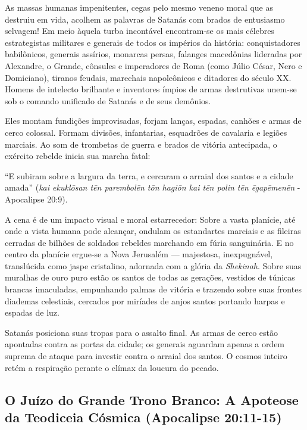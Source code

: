 \documentclass[11pt,a4paper,openany]{book}
\begin{document}
As massas humanas impenitentes, cegas pelo mesmo veneno moral que as destruiu em vida, acolhem as palavras de Satanás com brados de entusiasmo selvagem!
Em meio àquela turba incontável encontram-se os mais célebres estrategistas militares e generais de todos os impérios da história: conquistadores babilônicos, generais assírios, monarcas persas, falanges macedônias lideradas por Alexandre, o Grande, cônsules e imperadores de Roma (como Júlio César, Nero e Domiciano), tiranos feudais, marechais napoleônicos e ditadores do século XX. Homens de intelecto brilhante e inventores ímpios de armas destrutivas unem-se sob o comando unificado de Satanás e de seus demônios.

Eles montam fundições improvisadas, forjam lanças, espadas, canhões e armas de cerco colossal. Formam divisões, infantarias, esquadrões de cavalaria e legiões marciais. Ao som de trombetas de guerra e brados de vitória antecipada, o exército rebelde inicia sua marcha fatal:

``E subiram sobre a largura da terra, e cercaram o arraial dos santos e a cidade amada'' (\textit{kai ekuklōsan tēn parembolēn tōn hagiōn kai tēn polin tēn ēgapēmenēn} - Apocalipse 20:9).

A cena é de um impacto visual e moral estarrecedor:
Sobre a vasta planície, até onde a vista humana pode alcançar, ondulam os estandartes marciais e as fileiras cerradas de bilhões de soldados rebeldes marchando em fúria sanguinária.
E no centro da planície ergue-se a Nova Jerusalém — majestosa, inexpugnável, translúcida como jaspe cristalino, adornada com a glória da \textit{Shekinah}. Sobre suas muralhas de ouro puro estão os santos de todas as gerações, vestidos de túnicas brancas imaculadas, empunhando palmas de vitória e trazendo sobre suas frontes diademas celestiais, cercados por miríades de anjos santos portando harpas e espadas de luz.

Satanás posiciona suas tropas para o assalto final. As armas de cerco estão apontadas contra as portas da cidade; os generais aguardam apenas a ordem suprema de ataque para investir contra o arraial dos santos. O cosmos inteiro retém a respiração perante o clímax da loucura do pecado.



\subsection{O Juízo do Grande Trono Branco: A Apoteose da Teodiceia Cósmica (Apocalipse 20:11-15)}
\end{document}
